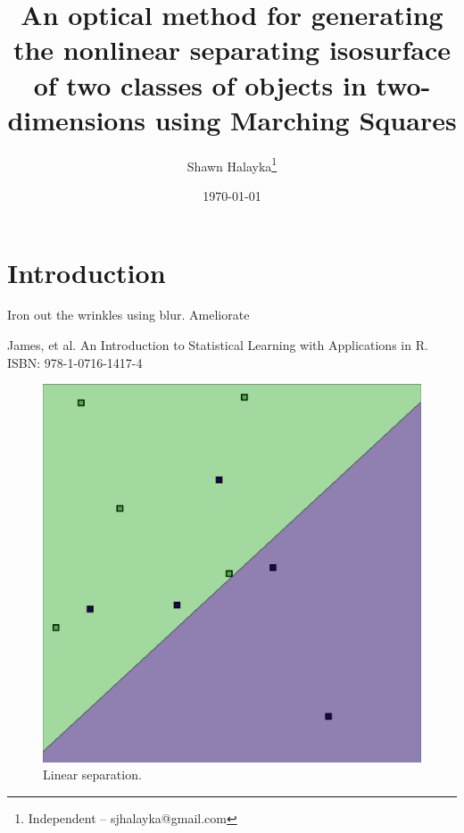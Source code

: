 \documentclass[12pt]{article}
\title{An optical method for generating the nonlinear separating isosurface of two classes of objects in two-dimensions using Marching Squares}
\author{
Shawn Halayka\footnote{Independent -- sjhalayka@gmail.com}
}
\date{\today\;\currenttime}
\begin{document}
\maketitle

\begin{abstract}

\end{abstract}




\section{Introduction}

Iron out the wrinkles using blur.
Ameliorate

\pagebreak





\begin{thebibliography}{9}

 James, et al. An Introduction to Statistical Learning with Applications in R. ISBN: 978-1-0716-1417-4

\end{thebibliography}





\pagebreak






\begin{figure} 
\centering
  \includegraphics[width = 6 in]{linear_separation.png}
  \caption{Linear separation.
}
\end{figure}
\end{document}
